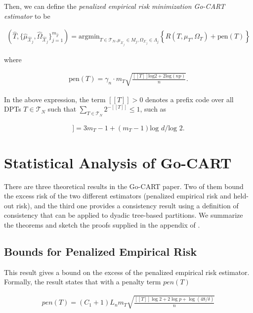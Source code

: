 \documentclass[12pt]{article}
\begin{document}
Then, we can define the \emph{penalized empirical risk minimization
  Go-CART estimator} to be

\begin{align}
    \left( \hat{T}, \{ \hat{\mu}_{\hat{\mathcal{X}}_j}, \hat{\Omega}_{\hat{\mathcal{X}}_j} \}_{j=1}^{m_{\hat{T}}} \right) 
    = \text{argmin}_{T \in \mathcal{T}_N, \mu_{\mathcal{X}_j} \in M_j, \Omega_{\mathcal{X}_j} \in \Lambda_j} 
    \left\{ \hat{R}(T,\mu_T,\Omega_T) + \text{pen}(T) \right\}
\end{align}

where

\begin{align}
    \text{pen}(T) = \gamma_n \cdot m_T \sqrt{\frac{[[T]]\text{log}2 + 2\text{log}(np)}{n}}.
\end{align}

In the above expression, the term $[[T]] > 0$ denotes a prefix code
over all DPTs $T \in \mathcal{T}_N$ such that $\sum_{T\in
  \mathcal{T}_N} 2^{-[[T]]} \leq 1$, such as

\begin{align}
    [[T]] = 3 m_T - 1 + (m_T - 1)\text{log }d / \text{log }2.
\end{align}

\section{Statistical Analysis of Go-CART}

There are three theoretical results in the Go-CART paper. Two of them
bound the excess risk of the two different estimators (penalized
empirical risk and held-out risk), and the third one provides a
consistency result using a definition of consistency that can be
applied to dyadic tree-based partitions. We summarize the theorems and
sketch the proofs supplied in the appendix of \cite{liu2010}.

\subsection{Bounds for Penalized Empirical Risk}

This result gives a bound on the excess of the penalized empirical
risk estimator. Formally, the result states that with a penalty term
$pen(T)$

\begin{align}
    pen(T) = (C_1 + 1) L_n m_T
    \sqrt{
        \frac{[[T]] \log 2 + 2 \log p + \log(48/\delta)}
        {n}
    }
\end{align}
\end{document}
